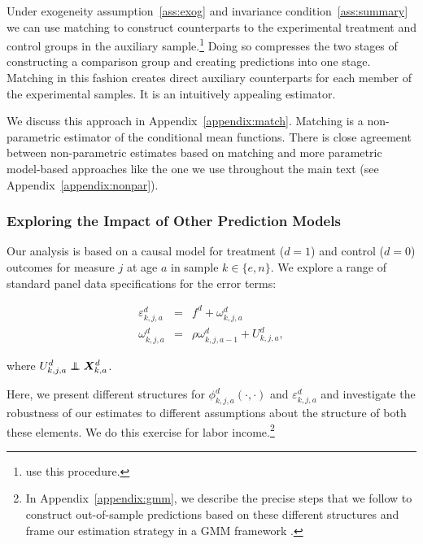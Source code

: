 Under exogeneity assumption~\ref{ass:exog} and invariance condition~\ref{ass:summary} we can use matching to construct counterparts to the experimental treatment and control groups in the auxiliary sample.\footnote{\citet{Heckman_Ichimura_etal_1998_Econometrica} use this procedure.} Doing so compresses the two stages of constructing a comparison group and creating predictions into one stage. Matching in this fashion creates direct auxiliary counterparts for each member of the experimental samples. It is an intuitively appealing estimator.

We discuss this approach in Appendix~\ref{appendix:match}. Matching is a non-parametric estimator of the conditional mean functions. There is close agreement between non-parametric estimates based on matching and more parametric model-based approaches like the one we use throughout the main text (see  Appendix~\ref{appendix:nonpar}).

\subsubsection{Exploring the Impact of Other Prediction Models} \label{appendix:predsensitivity}

Our analysis is based on a causal model for treatment ($d=1$) and control ($d=0$) outcomes for measure $j$ at age $a$ in sample $k \in \{e,n\}$. We explore a range of standard panel data specifications for the error terms:

\begin{eqnarray}
\varepsilon^d_{k,j,a} &=& f^d + \omega^d_{k,j,a} \nonumber \\
\omega^d_{k,j,a}      &=& \rho \omega^d_{k,j,a-1} + U^d_{k,j,a},
\end{eqnarray}

\noindent where $U^d_{k,j,a} \independent \bm{X}^d_{k,a}$.

Here, we present different structures for $\phi_{k,j,a}^d \left( \cdot, \cdot \right)$ and $\varepsilon_{k,j,a}^d$ and investigate the robustness of our estimates to different assumptions about the structure of both these elements. We do this exercise for labor income.\footnote{In Appendix~\ref{appendix:gmm}, we describe the precise steps that we follow to construct out-of-sample predictions based on these different structures and frame our estimation strategy in a GMM framework \citep{Hansen_1982_Econometrica}.}

